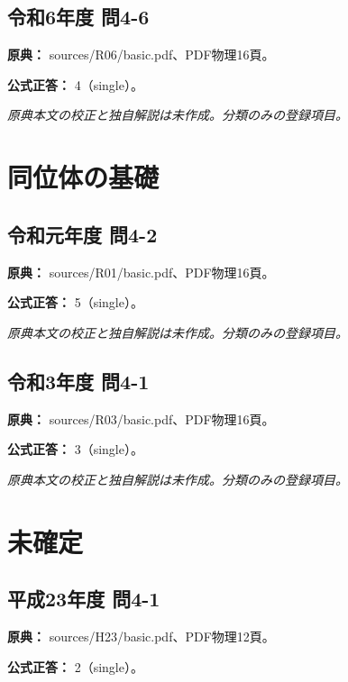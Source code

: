 \subsection{令和6年度 問4-6}
\label{q:r06-reg-basic-4-6}

\noindent\textbf{原典：} sources/R06/basic.pdf、PDF物理16頁。

\textbf{公式正答：} 4（single）。

\par\textit{原典本文の校正と独自解説は未作成。分類のみの登録項目。}

\section{同位体の基礎}

\subsection{令和元年度 問4-2}
\label{q:r01-reg-basic-4-2}

\noindent\textbf{原典：} sources/R01/basic.pdf、PDF物理16頁。

\textbf{公式正答：} 5（single）。

\par\textit{原典本文の校正と独自解説は未作成。分類のみの登録項目。}

\subsection{令和3年度 問4-1}
\label{q:r03-reg-basic-4-1}

\noindent\textbf{原典：} sources/R03/basic.pdf、PDF物理16頁。

\textbf{公式正答：} 3（single）。

\par\textit{原典本文の校正と独自解説は未作成。分類のみの登録項目。}

\section{未確定}

\subsection{平成23年度 問4-1}
\label{q:h23-reg-basic-4-1}

\noindent\textbf{原典：} sources/H23/basic.pdf、PDF物理12頁。

\textbf{公式正答：} 2（single）。

